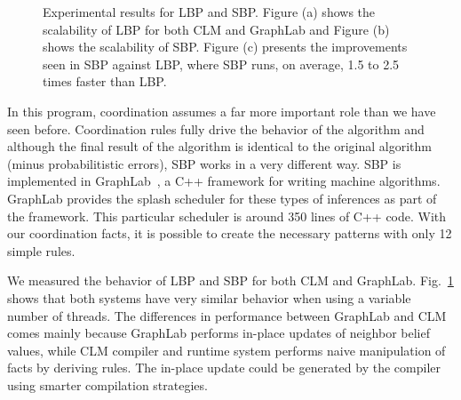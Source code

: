 \begin{figure}[ht!]
   \begin{center}
   \end{center}
   \caption{Experimental results for LBP and SBP. Figure (a) shows the
      scalability of LBP for both CLM and GraphLab and Figure (b) shows the
      scalability of SBP. Figure (c) presents the
      improvements seen in SBP against LBP, where SBP runs, on average, 1.5 to 2.5
      times faster than LBP.}
   \label{results:splash_bp}
\end{figure}


In this program, coordination assumes a far more important role than we have
seen before. Coordination rules fully drive the behavior of the algorithm and
although the final result of the algorithm is identical to the original
algorithm (minus probabilitistic errors), SBP works in a very different way.
SBP is implemented in GraphLab~\cite{GraphLab2010}, a C++ framework for writing machine algorithms.
GraphLab provides the splash scheduler for these types of inferences as part of
the framework. This particular scheduler is around 350 lines of C++ code.
With our coordination facts, it is possible to create the necessary
patterns with only 12 simple rules.

We measured the behavior of LBP and SBP for both CLM and GraphLab.
Fig.~\ref{results:splash_bp} shows that both systems have very similar behavior
when using a variable number of threads.  The differences in performance between
GraphLab and CLM comes mainly because GraphLab performs in-place updates of
neighbor belief values, while CLM compiler and runtime system performs naive
manipulation of facts by deriving rules. The in-place update could be generated
by the compiler using smarter compilation strategies.
